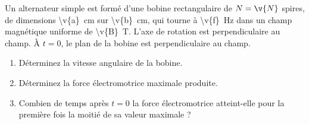 Un alternateur simple est formé d'une bobine rectangulaire de $N = \v{N}$ spires, de dimensions \qty{\v{a}}{cm} sur \qty{\v{b}}{cm}, qui tourne à \qty{\v{f}}{Hz} dans un champ magnétique uniforme de \qty{\v{B}}{T}. L'axe de rotation est perpendiculaire au champ. À $t = 0$, le plan de la bobine est perpendiculaire au champ.

\begin{enumerate}[label=\alph*)]
    \item Déterminez la vitesse angulaire de la bobine.
    \item Déterminez la force électromotrice maximale produite.
    \item Combien de temps après $t = 0$ la force électromotrice atteint-elle pour la première fois la moitié de sa valeur maximale ?
\end{enumerate}
